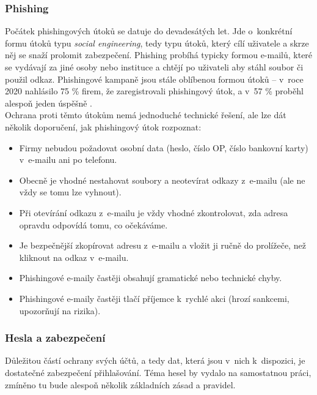 \subsubsection*{Phishing}
Počátek phishingových útoků se datuje do devadesátých let. Jde o~konkrétní formu útoků typu \textit{social engineering}, tedy typu útoků, který cílí uživatele a skrze něj se snaží prolomit zabezpečení. Phishing probíhá typicky formou e-mailů, které se vydávají za jiné osoby nebo instituce a chtějí po uživateli aby stáhl soubor či použil odkaz. Phishingové kampaně jsou stále oblíbenou formou útoků -- v~roce 2020 nahlásilo 75 \% firem, že zaregistrovali phishingový útok, a v~57 \% proběhl alespoň jeden úspěšně \citep{phishing-success}.\\
Ochrana proti těmto útokům nemá jednoduché technické řešení, ale lze dát několik doporučení, jak phishingový útok rozpoznat:
\begin{itemize}
	\item Firmy nebudou požadovat osobní data (heslo, číslo OP, číslo bankovní karty) v~e-mailu ani po telefonu.
	\item Obecně je vhodné nestahovat soubory a neotevírat odkazy z~e-mailu (ale ne vždy se tomu lze vyhnout).
	\item Při otevírání odkazu z~e-mailu je vždy vhodné zkontrolovat, zda adresa opravdu odpovídá tomu, co očekáváme.
	\item Je bezpečnější zkopírovat adresu z~e-mailu a vložit ji ručně do prolížeče, než kliknout na odkaz v~e-mailu.
	\item Phishingové e-maily častěji obsahují gramatické nebo technické chyby.
	\item Phishingové e-maily častěji tlačí příjemce k~rychlé akci (hrozí sankcemi, upozorňují na rizika).
\end{itemize}




\subsubsection*{Hesla a zabezpečení}
Důležitou částí ochrany svých účtů, a tedy dat, která jsou v~nich k~dispozici, je dostatečné zabezpečení přihlašování. Téma hesel by vydalo na samostatnou práci, zmíněno tu bude alespoň několik základních zásad a pravidel.

